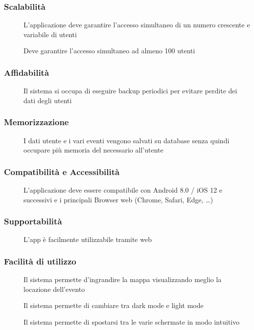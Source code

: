 \documentclass{article}
\let\origthesubsubsection\thesubsubsection
\begin{document}
\subsubsection{Scalabilità} \label{rnf_3}
\begin{description}
    \item[] L'applicazione deve garantire l'accesso simultaneo di un numero crescente e variabile di utenti
    \item[] Deve garantire l'accesso simultaneo ad almeno 100 utenti
\end{description}
\subsubsection{Affidabilità} \label{rnf_4}
\begin{description}
    \item[] Il sistema si occupa di eseguire backup periodici per evitare perdite dei dati degli utenti
\end{description}
\subsubsection{Memorizzazione} \label{rnf_5}
\begin{description}
    \item[] I dati utente e i vari eventi vengono salvati su database senza quindi occupare più memoria del necessario all'utente
\end{description}
\subsubsection{Compatibilità e Accessibilità} \label{rnf_6}
\begin{description}
    \item[] L’applicazione deve essere compatibile con Android 8.0 / iOS 12 e successivi e i principali Browser web (Chrome, Safari, Edge, \dots)
\end{description}
\subsubsection{Supportabilità} \label{rnf_7}
\begin{description}
    \item[] L'app è facilmente utilizzabile tramite web
\end{description}
\subsubsection{Facilità di utilizzo} \label{rnf_8}
\begin{description}
    \item[] Il sistema permette d'ingrandire la mappa visualizzando meglio la locazione dell'evento
    \item[] Il sistema permette di cambiare tra dark mode e light mode
    \item[] Il sistema permette di spostarsi tra le varie schermate in modo intuitivo
\end{description}
\renewcommand\thesubsubsection{\origthesubsubsection}
\clearpage
\end{document}

